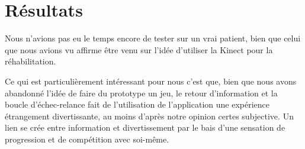 \section{Résultats}\label{resultats}
Nous n'avions pas eu le temps encore de tester sur un vrai patient, bien que 
celui que nous avions vu affirme être venu sur l'idée d'utiliser la Kinect pour
la réhabilitation.

Ce qui est particulièrement intéressant pour nous c'est que, bien que nous avons
abandonné l'idée de faire du prototype un jeu, le retour d'information et la boucle
d'échec-relance fait de l'utilisation de l'application une expérience 
étrangement divertissante, au moins d'après notre opinion certes subjective. 
Un lien se crée entre information et divertissement 
par le bais d'une sensation de progression et de compétition avec soi-même.